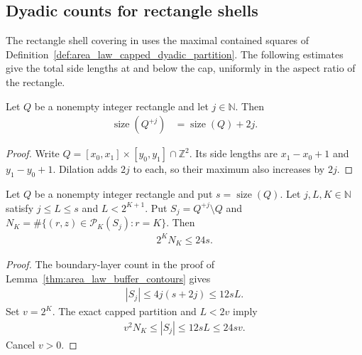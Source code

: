 \subsection{Dyadic counts for rectangle shells}

The rectangle shell covering in
\cite[proof of Proposition~9.5, lines~717--729]{OpenAI2026AreaLaw}
uses the maximal contained squares of
Definition~\ref{def:area_law_capped_dyadic_partition}.
The following estimates give the total side lengths at and below the cap,
uniformly in the aspect ratio of the rectangle.

\begin{lemma}
    \label{thm:area_law_rectangle_dilate_size}
    \leanok
    Let $Q$ be a nonempty integer rectangle and let $j\in\mathbb N$.
    Then
    \begin{align}
        \operatorname{size}(Q^{+j})
         & =\operatorname{size}(Q)+2j.
    \end{align}
\end{lemma}
\begin{proof}\leanok
    Write $Q=[x_0,x_1]\times[y_0,y_1]\cap\mathbb Z^2$.
    Its side lengths are $x_1-x_0+1$ and $y_1-y_0+1$.
    Dilation adds $2j$ to each, so their maximum also increases by $2j$.
\end{proof}

\begin{lemma}
    \label{thm:area_law_rectangle_shell_cap_count}
    \leanok
    Let $Q$ be a nonempty integer rectangle and put
    $s=\operatorname{size}(Q)$.
    Let $j,L,K\in\mathbb N$ satisfy $j\le L\le s$ and $L<2^{K+1}$.
    Put $S_j=Q^{+j}\setminus Q$ and
    $N_K=\#\{(r,z)\in\mathcal P_K(S_j):r=K\}$.
    Then
    \begin{align}
        2^K N_K\le24s.
    \end{align}
\end{lemma}
\begin{proof}\leanok
    The boundary-layer count in the proof of
    Lemma~\ref{thm:area_law_buffer_contours} gives
    \begin{align}
        |S_j|\le4j(s+2j)\le12sL.
    \end{align}
    Set $v=2^K$. The exact capped partition and $L<2v$ imply
    \begin{align}
        v^2N_K\le |S_j|\le12sL\le24sv.
    \end{align}
    Cancel $v>0$.
\end{proof}

